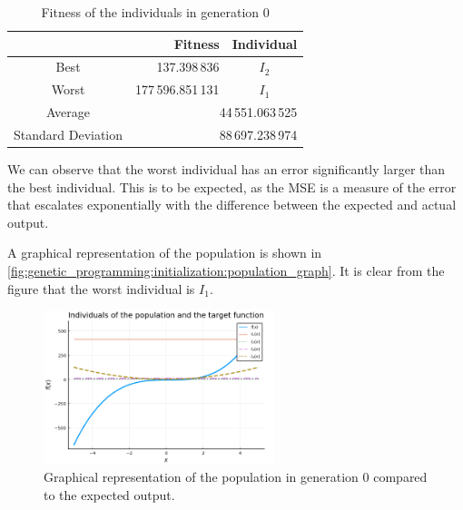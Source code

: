   \begin{table}[ht!]
    \centering
    \begin{tabular}{|c|r|c|}
      \hline
      & \textbf{Fitness} & \textbf{Individual}  \\
      \hline
      Best & 137.398\,836 & \(I_2\) \\
      Worst & 177\,596.851\,131 & \(I_1\) \\
      \hline
      \hline
      Average & \multicolumn{2}{r|}{44\,551.063\,525} \\
      \hline
      Standard Deviation & \multicolumn{2}{r|}{88\,697.238\,974} \\
      \hline
    \end{tabular}
    \caption{Fitness of the individuals in generation 0}
    \label{tab:genetic_programming:initialization:fitness}
  \end{table}

  We can observe that the worst individual has an error significantly larger
  than the best individual.
  This is to be expected, as the MSE is a measure of the error that escalates
  exponentially with the difference between the expected and actual output.  

  A graphical representation of the population is shown in
  \vref{fig:genetic_programming:initialization:population_graph}.
  It is clear from the figure that the worst individual is \(I_1\).

  \begin{figure}[ht!]
    \centering
    \includegraphics[width=0.6\textwidth]{img/theoretical_framework/gp_pop_init.png}
    \caption{
      Graphical representation of the population in generation 0 compared to the
      expected output.
    }
    \label{fig:genetic_programming:initialization:population_graph}
  \end{figure}

